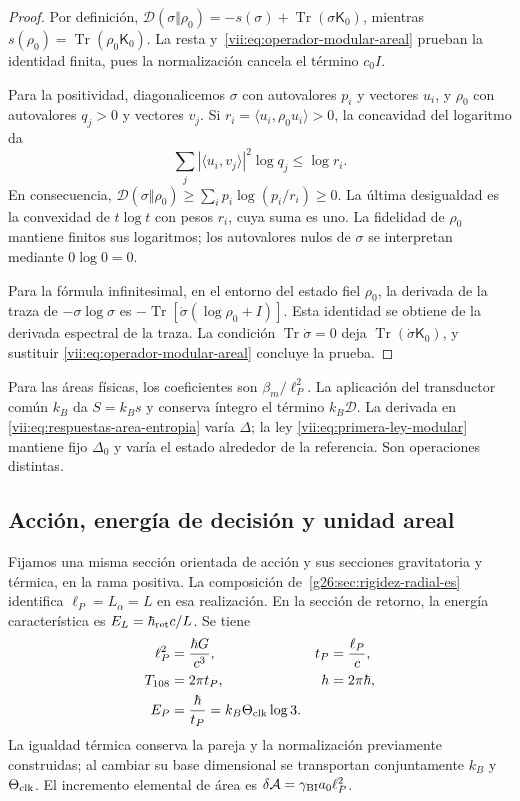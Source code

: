 \begin{proof}
Por definición,
\(\mathcal D(\sigma\Vert\rho_0)=-s(\sigma)
+\operatorname{Tr}(\sigma\mathsf K_0)\), mientras
\(s(\rho_0)=\operatorname{Tr}(\rho_0\mathsf K_0)\).
La resta y~\eqref{vii:eq:operador-modular-areal} prueban la identidad
finita, pues la normalización cancela el término \(c_0I\).

Para la positividad, diagonalicemos \(\sigma\) con autovalores
\(p_i\) y vectores \(u_i\), y \(\rho_0\) con autovalores
\(q_j>0\) y vectores \(v_j\). Si
\(r_i=\langle u_i,\rho_0u_i\rangle>0\), la concavidad del
logaritmo da
\[
 \sum_j|\langle u_i,v_j\rangle|^2\log q_j\le\log r_i.
\]
En consecuencia,
\(\mathcal D(\sigma\Vert\rho_0)
\ge\sum_i p_i\log(p_i/r_i)\ge0\).
La última desigualdad es la convexidad de \(t\log t\) con pesos
\(r_i\), cuya suma es uno. La fidelidad de \(\rho_0\) mantiene
finitos sus logaritmos; los autovalores nulos de \(\sigma\) se
interpretan mediante \(0\log0=0\).

Para la fórmula infinitesimal, en el entorno del estado fiel \(\rho_0\),
la derivada de la traza de \(-\sigma\log\sigma\) es
\(-\operatorname{Tr}[\dot\sigma(\log\rho_0+I)]\).
Esta identidad se obtiene de la derivada espectral de la traza.
La condición \(\operatorname{Tr}\dot\sigma=0\) deja
\(\operatorname{Tr}(\dot\sigma\mathsf K_0)\), y sustituir
\eqref{vii:eq:operador-modular-areal} concluye la prueba.
\end{proof}

Para las áreas físicas, los coeficientes son \(\beta_m/\ell_P^2\).
La aplicación del transductor común \(k_B\) da \(S=k_Bs\) y
conserva íntegro el término \(k_B\mathcal D\). La derivada en
\eqref{vii:eq:respuestas-area-entropia} varía \(\Delta\); la ley
\eqref{vii:eq:primera-ley-modular} mantiene fijo \(\Delta_0\) y
varía el estado alrededor de la referencia. Son operaciones distintas.

\subsection{Acción, energía de decisión y unidad areal}
\label{vii:subsec:conversion-informacion-area}

Fijamos una misma sección orientada de acción y sus secciones gravitatoria
y térmica, en la rama positiva. La composición
de~\ref{g26:sec:rigidez-radial-es} identifica
\(\ell_P=L_\alpha=L\) en esa realización. En la sección de retorno,
la energía característica es \(E_L=\hbar_{\rm ret}c/L\). Se tiene
\begin{equation}
 \begin{aligned}
 \ell_P^2&=\frac{\hbar G}{c^3},& t_P&=\frac{\ell_P}{c},\\
 T_{108}&=2\pi t_P,& h&=2\pi\hbar,\\
 E_P&=\frac{\hbar}{t_P}=k_B\Theta_{\rm clk}\log3.&&
 \end{aligned}
 \label{vii:eq:unidad-accion-informacion}
\end{equation}
La igualdad térmica conserva la pareja y la normalización previamente
construidas; al cambiar su base dimensional se transportan conjuntamente
\(k_B\) y \(\Theta_{\rm clk}\). El incremento elemental de área es
\(\delta\mathcal A=\gamma_{\rm BI}a_0\ell_P^2\).

